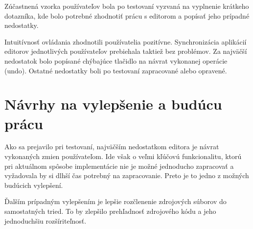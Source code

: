 Zúčastnená vzorka používateľov bola po testovaní vyzvaná na vyplnenie krátkeho dotazníka, kde bolo potrebné zhodnotiť prácu s editorom a popísať jeho prípadné nedostatky. 

Intuitívnosť ovládania zhodnotili používatelia pozitívne. Synchronizácia aplikácií editorov jednotlivých používateľov prebiehala taktiež bez problémov. Za najväčší nedostatok bolo popísané chýbajúce tlačidlo na návrat vykonanej operácie (undo). Ostatné nedostatky boli po testovaní zapracované alebo opravené.

\section{Návrhy na vylepšenie a budúcu prácu}
Ako sa prejavilo pri testovaní, najväčším nedostatkom editora je návrat vykonaných zmien používateľom. Ide však o veľmi kľúčovú funkcionalitu, ktorú pri aktuálnom spôsobe implementácie nie je možné jednoducho zapracovať a vyžadovala by si dlhší čas potrebný na zapracovanie. Preto je to jedno z možných budúcich vylepšení. 

Ďalším prípadným vylepšením je lepšie rozčlenenie zdrojových súborov do samostatných tried. To by zlepšilo prehľadnosť zdrojového kódu a jeho jednoduchšiu rozšíriteľnosť. 

